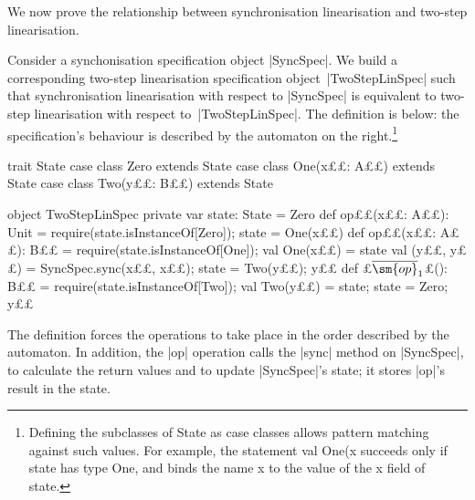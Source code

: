 We now prove the relationship between synchronisation linearisation and
two-step linearisation.

Consider a synchonisation specification object |SyncSpec|.  We build a
corresponding two-step linearisation specification object~|TwoStepLinSpec|
such that synchronisation linearisation with respect to |SyncSpec| is
equivalent to two-step linearisation with respect to~|TwoStepLinSpec|.  The
definition is below: the specification's behaviour is described by the
automaton on the right.\footnote{Defining the subclasses of {\scalashape
    State} as {\scalashape case class}es allows pattern matching against such
  values.  For example, the statement {\scalashape val One(x} succeeds only if {\scalashape state} has type {\scalashape One},
  and binds the name {\scalashape x} to the value of the {\scalashape x}
  field of {\scalashape state}.}
\begin{trivlist}
\item[]
\begin{minipage}[b]{68mm}
\begin{scala}
trait State
case class Zero extends State
case class One(x££: A££) extends State
case class Two(y££: B££) extends State
\end{scala}
\end{minipage}
%
\hfil
%
\begin{minipage}[b]{63mm}
\end{minipage}
%
%
%
\begin{scala}
object TwoStepLinSpec{
  private var state: State = Zero
  def op££(x££: A££): Unit = {
    require(state.isInstanceOf[Zero]); state = One(x££)
  }
  def op££(x££: A££): B££ = {
    require(state.isInstanceOf[One]); val One(x££) = state
    val (y££, y££) = SyncSpec.sync(x££, x££); state = Two(y££); y££
  }
  def £$\overline{\sm{op}}_1$£(): B££ = {
    require(state.isInstanceOf[Two]); val Two(y££) = state; state = Zero; y££
  }
}
\end{scala}
\end{trivlist}
%
%
The definition forces the operations to take place in the order described by
the automaton.  In addition, the |op| operation calls the |sync| method on
|SyncSpec|, to calculate the return values and to update |SyncSpec|'s state;
it stores |op|'s result in the state. 

